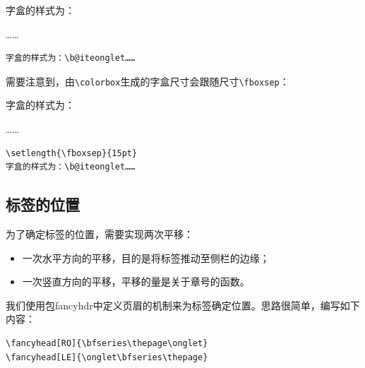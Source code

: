 
\newlength{\ongletwidth}
\newlength{\ongletheight}
\setlength{\ongletheight}{32pt}
\setlength{\ongletwidth}{.96cm}

\newcommand{\biteonglet}{%
    \colorbox[gray]{.7}{%
        \parbox[t][\ongletheight][s]{\ongletwidth}{%
            \vfill%
            \centering%
            \vfill}}}

\begin{codelist}[11.29]{
    字盒的样式为：\biteonglet……
}
\begin{verbatim}
字盒的样式为：\b@iteonglet……\end{verbatim}
\end{codelist}

需要注意到，由\verb|\colorbox|生成的字盒尺寸会跟随尺寸\verb|\fboxsep|：

\begin{codelist}[11.30]{
    \setlength{\fboxsep}{15pt}
    字盒的样式为：\biteonglet……
}
\begin{verbatim}
\setlength{\fboxsep}{15pt}
字盒的样式为：\b@iteonglet……\end{verbatim}
\end{codelist}

\subsection{标签的位置}

为了确定标签的位置，需要实现两次平移：

\begin{itemize}
    \item 一次水平方向的平移，目的是将标签推动至侧栏的边缘；
    \item 一次竖直方向的平移，平移的量是关于章号的函数。
\end{itemize}

我们使用包\textsf{fancyhdr}中定义页眉的机制来为标签确定位置。思路很简单，编写如下内容：

\begin{dmd}
\begin{verbatim}
\fancyhead[RO]{\bfseries\thepage\onglet}
\fancyhead[LE]{\onglet\bfseries\thepage}\end{verbatim}
\end{dmd}


